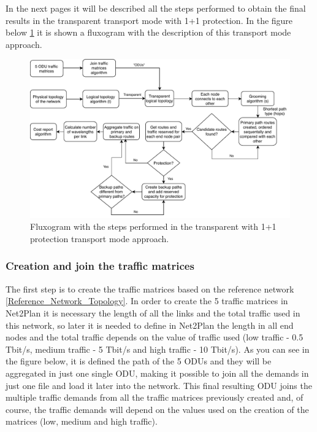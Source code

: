 In the next pages it will be described all the steps performed to obtain the final results in the transparent transport mode with 1+1 protection. In the figure below \ref{fluxogram_transp_protec} it is shown a fluxogram with the description of this transport mode approach.

\begin{figure}[H]
\centering
\includegraphics[width=16cm]{sdf/heuristic/transparent_protection/figures/fluxogram_transparent_protec}
\caption{Fluxogram with the steps performed in the transparent with 1+1 protection transport mode approach.}
\label{fluxogram_transp_protec}
\end{figure}

\newpage
\subsubsection{Creation and join the traffic matrices}

\noindent
The first step is to create the traffic matrices based on the reference network \ref{Reference_Network_Topology}. In order to create the 5 traffic matrices in Net2Plan it is necessary the length of all the links and the total traffic used in this network, so later it is needed to define in Net2Plan the length in all end nodes and the total traffic depends on the value of traffic used (low traffic - 0.5 Tbit/s, medium traffic - 5 Tbit/s and high traffic - 10 Tbit/s). As you can see in the figure below, it is defined the path of the 5 ODUs and they will be aggregated in just one single ODU, making it possible to join all the demands in just one file and load it later into the network. This final resulting ODU joins the multiple traffic demands from all the traffic matrices previously created and, of course, the traffic demands will depend on the values used on the creation of the matrices (low, medium and high traffic).

